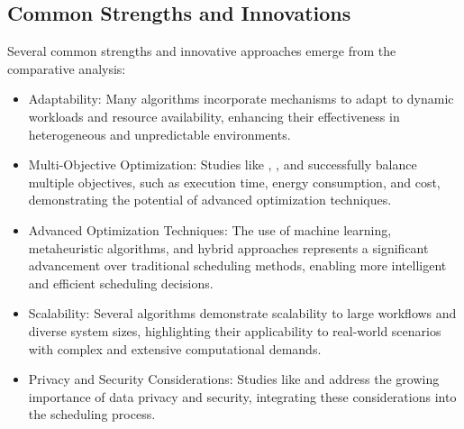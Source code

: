 \documentclass[a4paper, final]{article}
\begin{document}
\subsection{Common Strengths and Innovations}
Several common strengths and innovative approaches emerge from the comparative analysis:
\begin{itemize}
    \item Adaptability: Many algorithms incorporate mechanisms to adapt to dynamic workloads and resource availability, 
    enhancing their effectiveness in heterogeneous and unpredictable environments.

    \item Multi-Objective Optimization: Studies like \cite{bib:3_sandcat}, \cite{bib:6_marine}, and \cite{bib:10} successfully balance multiple objectives, such 
    as execution time, energy consumption, and cost, demonstrating the potential of advanced optimization techniques.
    
    \item Advanced Optimization Techniques: The use of machine learning, metaheuristic algorithms, and hybrid approaches 
    represents a significant advancement over traditional scheduling methods, enabling more intelligent and efficient 
    scheduling decisions.
    
    \item Scalability: Several algorithms demonstrate scalability to large workflows and diverse system sizes, highlighting 
    their applicability to real-world scenarios with complex and extensive computational demands.
    
    \item Privacy and Security Considerations: Studies like \cite{bib:2_faro} and \cite{bib:7_ppps} address the growing importance of data privacy and 
    security, integrating these considerations into the scheduling process.
\end{itemize}
\end{document}
